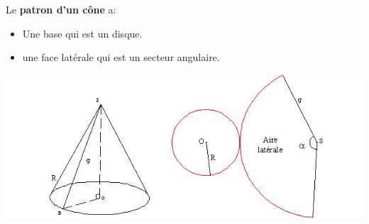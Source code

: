 
\begin{minipage}{0.48\linewidth}
Le \textbf{patron d'un cône} a:
\begin{itemize}
\item Une base qui est un disque.
\item une face latérale qui est un secteur angulaire.  
\end{itemize}
\end{minipage}
 \hfill
\begin{minipage}{0.48\linewidth}
\includegraphics[scale=0.4]{RepS-cone_develope.jpg} 
\end{minipage}